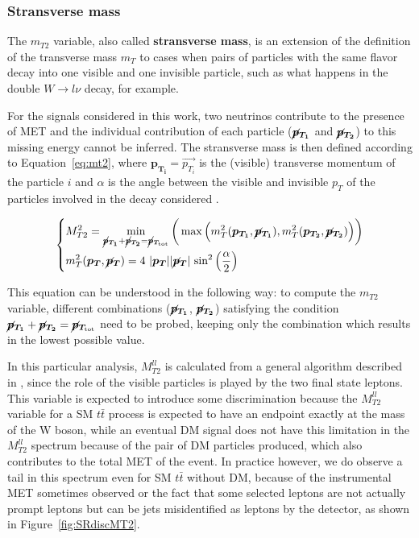 \documentclass[a4paper, 10pt, openright]{report}
\begin{document}
\subsubsection*{Stransverse mass}

The $m_{T2}$ variable, also called \textbf{stransverse mass}, is an extension of the definition of the transverse mass $m_T$ to cases when pairs of particles with the same flavor decay into one visible and one invisible particle, such as what happens in the double $W \rightarrow l\nu$ decay, for example. 

For the signals considered in this work, two neutrinos contribute to the presence of \ac{MET} and the individual contribution of each particle ($\bm{\cancel{p}_{T_{1}}}$ and $\bm{\cancel{p}_{T_2}}$) to this missing energy cannot be inferred. The stransverse mass is then defined according to Equation~\ref{eq:mt2}, where $\bm{p_{T_i}} = \overrightarrow{p_{T_i}}$ is the (visible) transverse momentum of the particle $i$ and $\alpha$ is the angle between the visible and invisible $p_T$ of the particles involved in the decay considered \cite{MT2}.

\begin{equation}
\label{eq:mt2}
\begin{dcases}
M_{T2}^2 = \min_{\bm{\cancel{p}_{T_{1}}} + \bm{\cancel{p}_{T_{2}}} = \bm{\cancel{p}_{T_{\text{tot}}}}} \bigg (\max \Big (m_T^2(\bm{p_{T_1}}, \bm{\cancel{p}_{T_{1}}}), m_T^2(\bm{p_{T_2}}, \bm{\cancel{p}_{T_{2}}}) \Big ) \bigg ) \\
m_T^2(\bm{p_{T}}, \bm{\cancel{p}_{T}}) = 4 \text{ } |\bm{p_{T}}| |\bm{\cancel{p}_{T}}| \text{ sin}^2 \left (\frac{\alpha}{2} \right ) 
\end{dcases}
\end{equation}

This equation can be understood in the following way: to compute the $m_{T2}$ variable, different combinations ($\bm{\cancel{p}_{T_{1}}}$, $\bm{\cancel{p}_{T_{2}}}$) satisfying the condition $\bm{\cancel{p}_{T_{1}}} + \bm{\cancel{p}_{T_{2}}} = \bm{\cancel{p}_{T_{\text{tot}}}}$ need to be probed, keeping only the combination which results in the lowest possible value.

In this particular analysis, $M_{T2}^{ll}$ is calculated from a general algorithm described in \cite{MT2Calc}, since the role of the visible particles is played by the two final state leptons. This variable is expected to introduce some discrimination because the $M_{T2}^{ll}$ variable for a \ac{SM} $t \bar t$ process is expected to have an endpoint exactly at the mass of the W boson, while an eventual \ac{DM} signal does not have this limitation in the $M_{T2}^{ll}$ spectrum because of the pair of \ac{DM} particles produced, which also contributes to the total \ac{MET} of the event. In practice however, we do observe a tail in this spectrum even for \ac{SM} $t \bar t$ without \ac{DM}, because of the instrumental \ac{MET} sometimes observed or the fact that some selected leptons are not actually prompt leptons but can be jets misidentified as leptons by the detector, as shown in Figure~\ref{fig:SRdiscMT2}.
\end{document}
